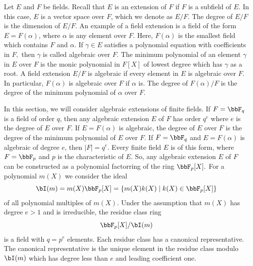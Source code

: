 




Let $E$ and $F$ be fields. 
Recall that $E$ is an extension of $F$ if $F$ is a subfield of $E$.
In this case, $E$ is a vector space over $F$, which we denote as $E/F.$
The degree of $E/F$ is the dimension of $E/F$.
An example of a field extension is a field of the form $E = F(\alpha)$, 
where $\alpha$ is any element over $F.$
Here, $F(\alpha)$ is the smallest field which contains $F$ and $\alpha.$
If $\gamma \in E$ satisfies a polynomial equation with coefficients in $F,$ 
then $\gamma$ is called algebraic over $F$.
The minimum polynomial of an element $\gamma$ in $E$ over $F$ is the monic  
polynomial in $F[X]$ of lowest degree which has $\gamma$ as a root. 
A field extension $E/F$ is algebraic 
if every element in $E$ is algebraic over $F$. 
In particular, $F(\alpha)$ is algebraic over $F$ if $\alpha$ is. 
The degree of $F(\alpha)/F$ is the degree 
of the minimum polynomial of $\alpha$ over $F$.

\bigskip


In this section, we will consider algebraic extensions of finite fields. 
If $F = \bbF_q$ is a field of order $q$, 
then any algebraic extension $E$ 
of $F$ has order $q^e$ where $e$ is the degree of $E$ over $F$.
If $E = F(\alpha)$ is algebraic, 
the degree of $E$ over $F$ 
is the degree of the minimum polynomial of $E$ over $F$.
If $F = \bbF_q$ and $E = F(\alpha)$ 
is algebraic of degree $e$, then $|F| = q^e.$
Every finite field $E$ is of this form, 
where $F = \bbF_p$ and $p$ is the characteristic of $E$.
So, any algebraic extension $E$ of 
$F$ can be constructed as a polynomial factorring 
of the ring $\bbF_p[X].$
For a polynomial $m(X)$ we consider the ideal 
$$
\bI(m) = m(X)\bbF_p[X] = \{m(X)k(X) \mid k(X) \in \bbF_p[X] \} 
$$
of all polynomial multiples of $m(X).$
Under the assumption that $m(X)$ 
has degree $e > 1$ and is irreducible, 
the residue class ring 
$$
\bbF_p[X]/ \bI(m)
$$
is a field with $q = p^e$ elements.
Each residue class has a canonical representative. 
The canonical representative is the unique element 
in the residue class modulo $\bI(m)$
which has degree less than $e$ and leading coefficient one. 

\bigskip


